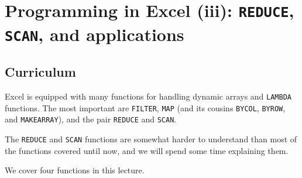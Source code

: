 \documentclass[
  letterpaper,
  DIV=11,
  numbers=noendperiod]{scrreprt}
\begin{document}

\hypertarget{programming-in-excel-iii-reduce-scan-and-applications}{%
\chapter{\texorpdfstring{Programming in Excel (iii): \texttt{REDUCE},
\texttt{SCAN}, and
applications}{Programming in Excel (iii): REDUCE, SCAN, and applications}}\label{programming-in-excel-iii-reduce-scan-and-applications}}

\hypertarget{curriculum-5}{%
\section{Curriculum}\label{curriculum-5}}

Excel is equipped with many functions for handling dynamic arrays and
\texttt{LAMBDA} functions. The most important are \texttt{FILTER},
\texttt{MAP} (and its cousins \texttt{BYCOL}, \texttt{BYROW}, and
\texttt{MAKEARRAY}), and the pair \texttt{REDUCE} and \texttt{SCAN}.

The \texttt{REDUCE} and \texttt{SCAN} functions are somewhat harder to
understand than most of the functions covered until now, and we will
spend some time explaining them.

We cover four functions in this lecture.
\end{document}
